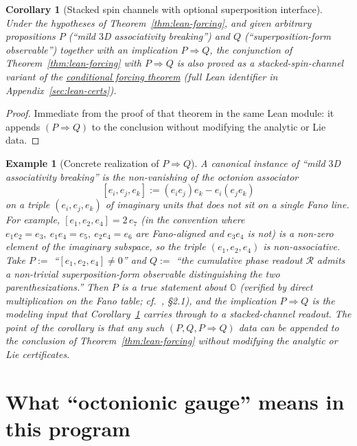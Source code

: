 \documentclass[11pt]{amsart}
\newtheorem{corollary}[theorem]{Corollary}
\newtheorem{example}[theorem]{Example}
\begin{document}
\begin{corollary}[Stacked spin channels with optional superposition interface]
\label{cor:stacked-spin-channels}
Under the hypotheses of Theorem~\ref{thm:lean-forcing}, and given arbitrary propositions \(P\) (``mild \(3\)D associativity breaking'') and \(Q\) (``superposition-form observable'') together with an implication \(P\Rightarrow Q\), the conjunction of Theorem~\ref{thm:lean-forcing} with \(P\Rightarrow Q\) is also proved as a stacked-spin-channel variant of the \hyperref[lean:forcing-theorem]{conditional forcing theorem} (full Lean identifier in Appendix~\ref{sec:lean-certs}).
\end{corollary}

\begin{proof}
Immediate from the proof of that theorem in the same Lean module: it appends \((P\Rightarrow Q)\) to the conclusion without modifying the analytic or Lie data.
\end{proof}

\begin{example}[Concrete realization of \(P\Rightarrow Q\)]
\label{ex:associator-PQ}
A canonical instance of ``mild \(3\)D associativity breaking'' is the non-vanishing of the octonion associator
\[
[e_i,e_j,e_k]:=(e_ie_j)e_k-e_i(e_je_k)
\]
on a triple \((e_i,e_j,e_k)\) of imaginary units that does \emph{not} sit on a single Fano line. For example, \([e_1,e_2,e_4]=2\,e_7\) (in the convention where \(e_1e_2=e_3,\ e_1e_4=e_5,\ e_2e_4=e_6\) are Fano-aligned and \(e_3 e_4\) is not) is a non-zero element of the imaginary subspace, so the triple \((e_1,e_2,e_4)\) is non-associative. Take \(P:=\) ``\([e_1,e_2,e_4]\neq 0\)'' and \(Q:=\) ``the cumulative phase readout \(\mathcal{R}\) admits a non-trivial superposition-form observable distinguishing the two parenthesizations.'' Then \(P\) is a true statement about \(\mathbb{O}\) (verified by direct multiplication on the Fano table; cf.~\cite{baez2002octonions}, \S2.1), and the implication \(P\Rightarrow Q\) is the modeling input that Corollary~\ref{cor:stacked-spin-channels} carries through to a stacked-channel readout. The point of the corollary is that \emph{any} such \((P,Q,P\Rightarrow Q)\) data can be appended to the conclusion of Theorem~\ref{thm:lean-forcing} without modifying the analytic or Lie certificates.
\end{example}

\section{What ``octonionic gauge'' means in this program}
\label{sec:gauge-meaning}
\end{document}
